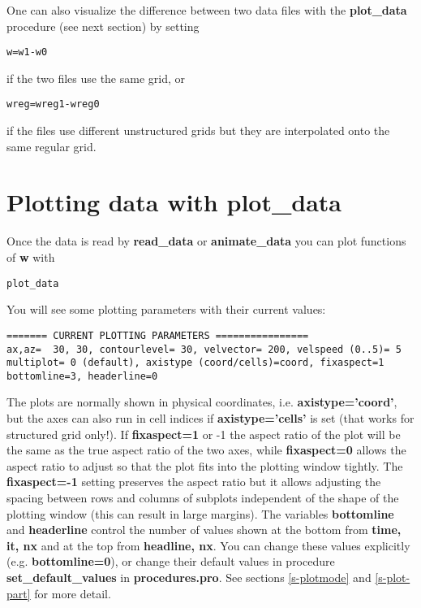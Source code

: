 \documentclass{article}
\begin{document}
One can also visualize the difference between two data files 
with the {\bf plot\_data} procedure (see next section) by setting
\begin{verbatim}
w=w1-w0
\end{verbatim}
   if the two files use the same grid, or
\begin{verbatim}
wreg=wreg1-wreg0
\end{verbatim}
if the files use different unstructured grids but they are 
interpolated onto the same regular grid.

\section{Plotting data with plot\_data \label{s-plot_data}}

   Once the data is read by {\bf read\_data} or {\bf animate\_data} you can plot 
   functions of {\bf w} with
\begin{verbatim}
plot_data
\end{verbatim}
   You will see some plotting parameters with their current values:
\begin{verbatim}
======= CURRENT PLOTTING PARAMETERS ================
ax,az=  30, 30, contourlevel= 30, velvector= 200, velspeed (0..5)= 5
multiplot= 0 (default), axistype (coord/cells)=coord, fixaspect=1
bottomline=3, headerline=0
\end{verbatim}
The plots are normally shown in physical coordinates, i.e.
{\bf axistype='coord'}, but the axes can also run in cell indices 
if {\bf axistype='cells'} is set (that works for structured grid only!).
If {\bf fixaspect=1} or -1 the aspect ratio of the plot will be the same
as the true aspect ratio of the two axes, while {\bf fixaspect=0} allows
the aspect ratio to adjust so that 
the plot fits into the plotting window tightly. The {\bf fixaspect=-1}
setting preserves the aspect ratio but it allows adjusting the spacing 
between rows and columns of subplots independent of the shape
of the plotting window (this can result in large margins).
The variables {\bf bottomline} and {\bf headerline} control the number
of values shown at the bottom from {\bf time, it, nx} and at the top 
from {\bf headline, nx}.
You can change these values explicitly (e.g. {\bf bottomline=0}), or change 
their default values in procedure {\bf set\_default\_values} in {\bf procedures.pro}. 
See sections \ref{s-plotmode} and \ref{s-plot-part} for more detail.
\end{document}
